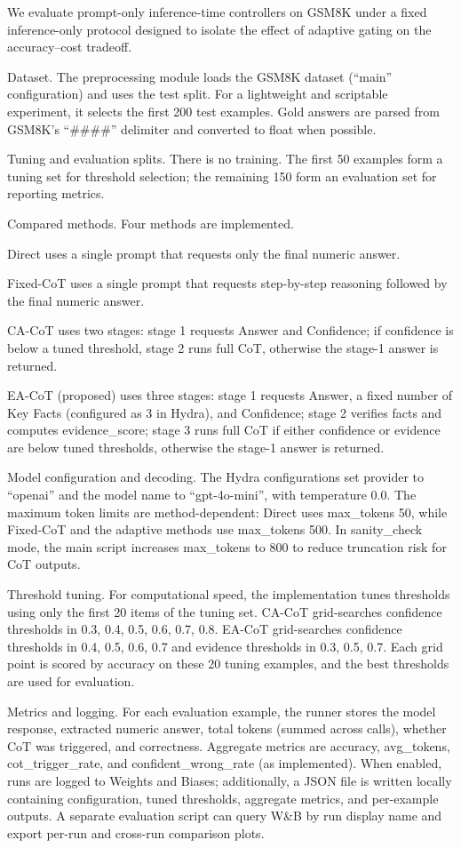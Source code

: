 \documentclass[journal,article,submit,pdftex,moreauthors]{Definitions/mdpi}
\begin{document}
We evaluate prompt-only inference-time controllers on GSM8K under a fixed inference-only protocol designed to isolate the effect of adaptive gating on the accuracy–cost tradeoff.

Dataset. The preprocessing module loads the GSM8K dataset (“main” configuration) and uses the test split. For a lightweight and scriptable experiment, it selects the first 200 test examples. Gold answers are parsed from GSM8K’s “####” delimiter and converted to float when possible.

Tuning and evaluation splits. There is no training. The first 50 examples form a tuning set for threshold selection; the remaining 150 form an evaluation set for reporting metrics.

Compared methods. Four methods are implemented.

Direct uses a single prompt that requests only the final numeric answer.

Fixed-CoT uses a single prompt that requests step-by-step reasoning followed by the final numeric answer.

CA-CoT uses two stages: stage 1 requests Answer and Confidence; if confidence is below a tuned threshold, stage 2 runs full CoT, otherwise the stage-1 answer is returned.

EA-CoT (proposed) uses three stages: stage 1 requests Answer, a fixed number of Key Facts (configured as 3 in Hydra), and Confidence; stage 2 verifies facts and computes evidence\_score; stage 3 runs full CoT if either confidence or evidence are below tuned thresholds, otherwise the stage-1 answer is returned.

Model configuration and decoding. The Hydra configurations set provider to “openai” and the model name to “gpt-4o-mini”, with temperature 0.0. The maximum token limits are method-dependent: Direct uses max\_tokens 50, while Fixed-CoT and the adaptive methods use max\_tokens 500. In sanity_check mode, the main script increases max\_tokens to 800 to reduce truncation risk for CoT outputs.

Threshold tuning. For computational speed, the implementation tunes thresholds using only the first 20 items of the tuning set. CA-CoT grid-searches confidence thresholds in {0.3, 0.4, 0.5, 0.6, 0.7, 0.8}. EA-CoT grid-searches confidence thresholds in {0.4, 0.5, 0.6, 0.7} and evidence thresholds in {0.3, 0.5, 0.7}. Each grid point is scored by accuracy on these 20 tuning examples, and the best thresholds are used for evaluation.

Metrics and logging. For each evaluation example, the runner stores the model response, extracted numeric answer, total tokens (summed across calls), whether CoT was triggered, and correctness. Aggregate metrics are accuracy, avg\_tokens, cot\_trigger\_rate, and confident\_wrong\_rate (as implemented). When enabled, runs are logged to Weights and Biases; additionally, a JSON file is written locally containing configuration, tuned thresholds, aggregate metrics, and per-example outputs. A separate evaluation script can query W\&B by run display name and export per-run and cross-run comparison plots.
\end{document}
